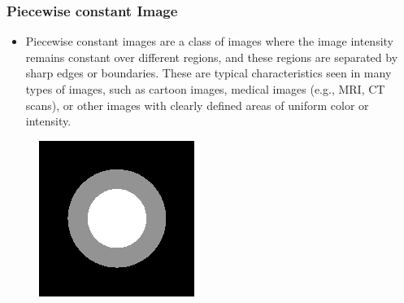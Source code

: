 \documentclass{beamer}
\begin{document}
\begin{frame}[t]
\frametitle{Piecewise constant Image}
    \begin{itemize}
        \item Piecewise constant images are a class of images where the image intensity remains constant over different regions, and these regions are separated by sharp edges or boundaries. These are typical characteristics seen in many types of images, such as cartoon images, medical images (e.g., MRI, CT scans), or other images with clearly defined areas of uniform color or intensity.
    \end{itemize}
    \begin{figure}
        
            \begin{columns}[onlytextwidth]
            \begin{column}{0.45\textwidth}
                \centering
                \includegraphics[width=.8\linewidth]{img/1.png}
               

\end{column}
\end{columns}
\end{figure}
\end{frame}
\end{document}
